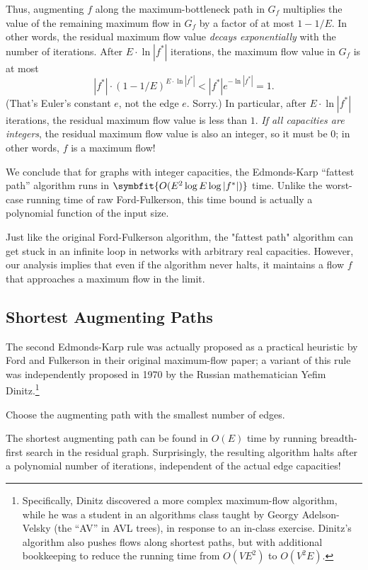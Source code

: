 Thus, augmenting $f$ along the maximum-bottleneck path in $G_f$ multiplies the value of the remaining maximum flow in $G_f$ by a factor of at most $1 - 1/E$.
In other words, the residual maximum flow value \textit{decays exponentially} with the number of iterations.
After $E \cdot \ln|f^*|$ iterations, the maximum flow value in $G_f$ is at most
\[
|f^*| \cdot (1 - 1/E)^{E \cdot \ln|f^*|} < |f^*| e^{-\ln|f^*|} = 1.
\]
(That’s Euler’s constant $e$, not the edge $e$. Sorry.)
In particular, after $E \cdot \ln|f^*|$ iterations, the residual maximum flow value is less than $1$.
\textit{If all capacities are integers}, the residual maximum flow value is also an integer, so it must be $0$; in other words, $f$ is a maximum flow!

We conclude that for graphs with integer capacities, the Edmonds-Karp “fattest path” algorithm runs in $\symbfit{O(E^2 \log E \log|f^*|)}$ time.
Unlike the worst-case running time of raw Ford-Fulkerson, this time bound is actually a polynomial function of the input size.

Just like the original Ford-Fulkerson algorithm, the "fattest path" algorithm can get stuck in an infinite loop in networks with arbitrary real capacities.
However, our analysis implies that even if the algorithm never halts, it maintains a flow $f$ that approaches a maximum flow in the limit.

\subsection{Shortest Augmenting Paths}

The second Edmonds-Karp rule was actually proposed as a practical heuristic by Ford and Fulkerson in their original maximum-flow paper; a variant of this rule was independently proposed in 1970 by the Russian mathematician Yefim Dinitz.\footnote{Specifically, Dinitz discovered a more complex maximum-flow algorithm, while he was a student in an algorithms class taught by Georgy Adelson-Velsky (the “AV” in AVL trees), in response to an in-class exercise. Dinitz’s algorithm also pushes flows along shortest paths, but with additional bookkeeping to reduce the running time from $O(VE^2)$ to $O(V^2E)$.}

\begin{problembox}
Choose the augmenting path with the smallest number of edges.
\end{problembox}

The shortest augmenting path can be found in $O(E)$ time by running breadth-first search in the residual graph.
Surprisingly, the resulting algorithm halts after a polynomial number of iterations, independent of the actual edge capacities!

